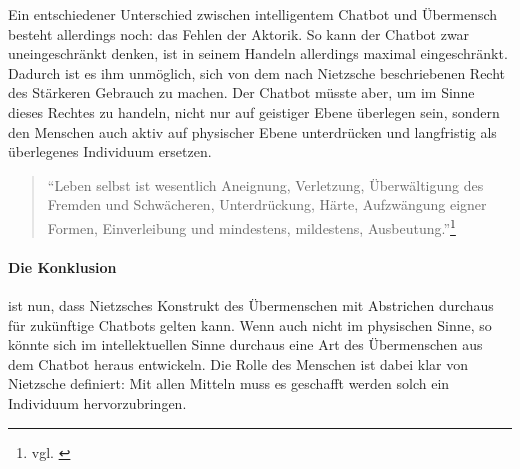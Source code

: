 Ein entschiedener Unterschied zwischen intelligentem Chatbot und Übermensch besteht allerdings noch: das Fehlen der Aktorik.
So kann der Chatbot zwar uneingeschränkt denken, ist in seinem Handeln allerdings maximal eingeschränkt.
Dadurch ist es ihm unmöglich, sich von dem nach Nietzsche beschriebenen Recht des Stärkeren Gebrauch zu machen.
Der Chatbot müsste aber, um im Sinne dieses Rechtes zu handeln, nicht nur auf geistiger Ebene überlegen sein, sondern den Menschen auch aktiv auf physischer Ebene unterdrücken und langfristig als überlegenes Individuum ersetzen.
\begin{quote}
\enquote{Leben selbst ist wesentlich Aneignung, Verletzung, Überwältigung des Fremden und Schwächeren, Unterdrückung, Härte, Aufzwängung eigner Formen, Einverleibung und mindestens, mildestens, Ausbeutung.}\footnote{vgl. \cite{Nietzsche12}}
\end{quote}

\paragraph{Die Konklusion} ist nun, dass Nietzsches Konstrukt des Übermenschen mit Abstrichen durchaus für zukünftige Chatbots gelten kann. 
Wenn auch nicht im physischen Sinne, so könnte sich im intellektuellen Sinne durchaus eine Art des Übermenschen aus dem Chatbot heraus entwickeln.
Die Rolle des Menschen ist dabei klar von Nietzsche definiert: Mit allen Mitteln muss es geschafft werden solch ein Individuum hervorzubringen.
